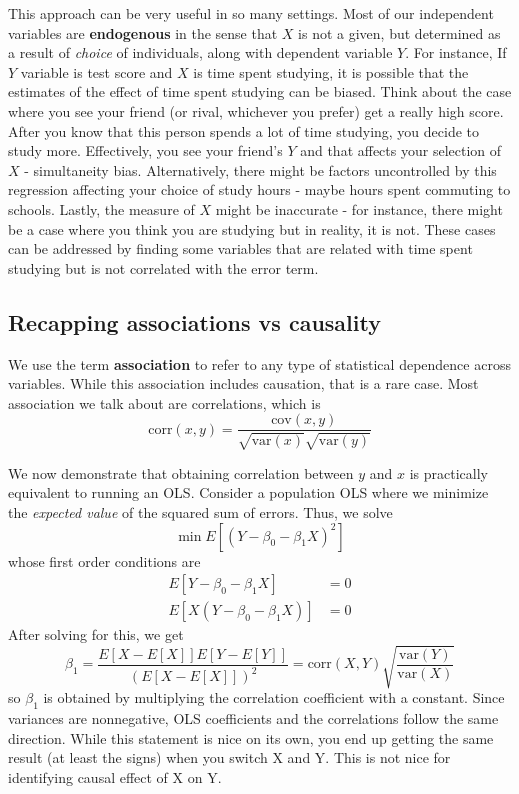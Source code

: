 \documentclass[12pt]{article}
\theoremstyle{definition}
\theoremstyle{property}
\theoremstyle{assumption}
\theoremstyle{example}
\theoremstyle{comment}
\begin{document}
This approach can be very useful in so many settings. Most of our independent variables are \textbf{endogenous} in the sense that $X$ is not a given, but determined as a result of \textit{choice} of individuals, along with dependent variable $Y$. For instance, If $Y$ variable is test score and $X$ is time spent studying, it is possible that the estimates of the effect of time spent studying can be biased. Think about the case where you see your friend (or rival, whichever you prefer) get a really high score. After you know that this person spends a lot of time studying, you decide to study more. Effectively, you see your friend's $Y$ and that affects your selection of $X$ - simultaneity bias. Alternatively, there might be factors uncontrolled by this regression affecting your choice of study hours  - maybe hours spent commuting to schools. Lastly, the measure of $X$ might be inaccurate - for instance, there might be a case where you think you are studying but in reality, it is not. These cases can be addressed by finding some variables that are related with time spent studying but is not correlated with the error term. 


\subsection{Recapping associations vs causality}
We use the term \textbf{association} to refer to any type of statistical dependence across variables. While this association includes causation, that is a rare case. Most association we talk about are correlations, which is
\[
\text{corr}(x,y) = \frac{\text{cov}(x,y)}{\sqrt{\text{var}(x)}\sqrt{\text{var}(y)}}
\]
\par
We now demonstrate that obtaining correlation between $y$ and $x$ is practically equivalent to running an OLS. Consider a population OLS where we minimize the \textit{expected value} of the squared sum of errors. Thus, we solve
\[
\min E[(Y-\beta_0-\beta_1X)^2]
\]
whose first order conditions are
\[
\begin{aligned}
E[Y-\beta_0-\beta_1X]&=0\\
E[X(Y-\beta_0-\beta_1X)]&=0
\end{aligned}
\]
After solving for this, we get
\[
\beta_1 = \frac{E[X-E[X]]E[Y-E[Y]]}{(E[X-E[X]])^2} = \text{corr}(X,Y)\sqrt{\frac{\text{var}(Y)}{\text{var}(X)}}
\]
so $\beta_1$ is obtained by multiplying the correlation coefficient with a constant. Since variances are nonnegative, OLS coefficients and the correlations follow the same direction. While this statement is nice on its own, you end up getting the same result (at least the signs) when you switch X and Y. This is not nice for identifying causal effect of X on Y.
\end{document}
